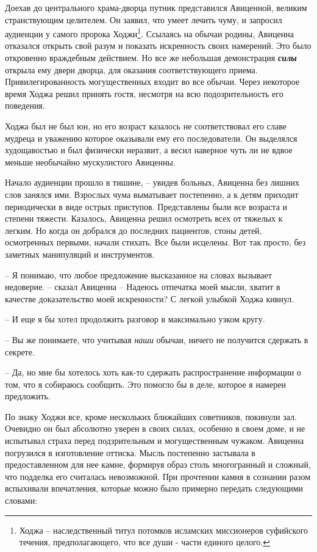 \documentclass[12pt,a4paper]{article}
\begin{document}
Доехав до центрального храма-дворца путник представился Авиценной, великим странствующим целителем. Он заявил, что умеет лечить чуму, и запросил аудиенции у самого пророка Ходжи\footnote{Ходжа -- наследственный титул потомков исламских миссионеров суфийского течения, предполагающего, что все души - части единого целого.}. Ссылаясь на обычаи родины, Авиценна отказался открыть свой разум и показать искренность своих намерений. Это было откровенно враждебным действием. Но все же небольшая демонстрация \textbf{\textit{силы}} открыла ему двери дворца, для оказания соответствующего приема. Привилегированность могущественных входит во все обычаи. Через некоторое время Ходжа решил принять гостя, несмотря на всю подозрительность его поведения.

Ходжа был не был юн, но его возраст казалось не соответствовал его славе мудреца и уважению которое оказывали ему его последователи. Он выделялся худощавостью и был физически неразвит, а весил наверное чуть ли не вдвое меньше необычайно мускулистого Авиценны.

Начало аудиенции прошло в тишине, -- увидев больных, Авиценна без лишних слов занялся ими. Взрослых чума выматывает постепенно, а к детям приходит периодически в виде острых приступов. Представлены были все возраста и степени тяжести. Казалось, Авиценна решил осмотреть всех от тяжелых к легким. Но когда он добрался до последних пациентов, стоны детей, осмотренных первыми, начали стихать. Все были исцелены. Вот так просто, без заметных манипуляций и инструментов.

-- Я понимаю, что любое предложение высказанное на словах вызывает недоверие. -- сказал Авиценна -- Надеюсь отпечатка моей мысли, хватит в качестве доказательство моей искренности?
С легкой улыбкой Ходжа кивнул.

-- И еще я бы хотел продолжить разговор в максимально узком кругу.

-- Вы же понимаете, что учитывая {\it наши} обычаи, ничего не получится сдержать в секрете.

-- Да, но мне бы хотелось хоть как-то сдержать распространение информации о том, что я собираюсь сообщить. Это помогло бы в деле, которое я намерен предложить.

По знаку Ходжи все, кроме нескольких ближайших советников, покинули зал. Очевидно он был абсолютно уверен в своих силах, особенно в своем доме, и не испытывал страха перед подзрительным и могущественным чужаком. Авиценна погрузился в изготовление оттиска. Мысль постепенно застывала в предоставленном для нее камне, формируя образ столь многогранный и сложный, что подделка его считалась невозможной. При прочтении камня в сознании разом вспыхивали впечатления, которые можно было примерно передать следующими словами:
\end{document}
